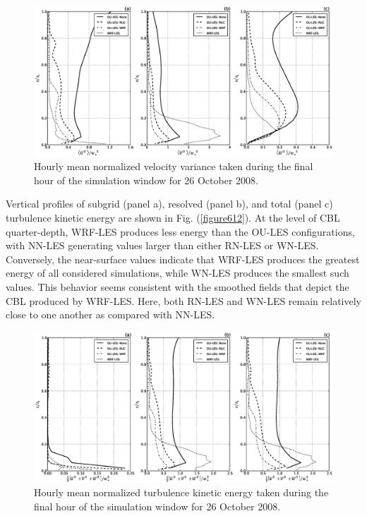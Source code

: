 \begin{figure}[H]
\begin{center}
\includegraphics[width=\textwidth]{figures/chapter6/velocity_variance_20081026}
\end{center}
\caption{Hourly mean normalized velocity variance taken during the final hour of the simulation window for 26 October 2008.}
\label{figure625}
\end{figure}


Vertical profiles of subgrid (panel a), resolved (panel b), and total (panel c) turbulence kinetic energy are shown in Fig. (\autoref{figure612}). At the level of CBL quarter-depth, WRF-LES produces less energy than the OU-LES configurations, with NN-LES generating values larger than either RN-LES or WN-LES. Conversely, the near-surface values indicate that WRF-LES produces the greatest energy of all considered simulations, while WN-LES produces the smallest such values. This behavior seems consistent with the smoothed fields that depict the CBL produced by WRF-LES. Here, both RN-LES and WN-LES remain relatively close to one another as compared with NN-LES. 


\begin{figure}[H]
\begin{center}
\includegraphics[width=\textwidth]{figures/chapter6/tke_20081026}
\end{center}
\caption{Hourly mean normalized turbulence kinetic energy taken during the final hour of the simulation window for 26 October 2008.}
\label{figure626}
\end{figure}


